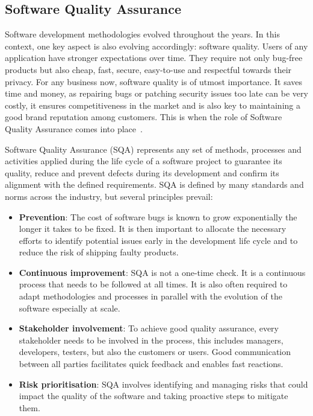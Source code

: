 \subsection{Software Quality Assurance}

Software development methodologies evolved throughout the years. In this context, one key aspect is also evolving accordingly: software quality. Users of any application have stronger expectations over time. They require not only bug-free products but also cheap, fast, secure, easy-to-use and respectful towards their privacy. For any business now, software quality is of utmost importance. It saves time and money, as repairing bugs or patching security issues too late can be very costly, it ensures competitiveness in the market and is also key to maintaining a good brand reputation among customers. This is when the role of Software Quality Assurance comes into place~\cite{galin2004software,beizer1984software,tripathy2011software}.

Software Quality Assurance (SQA) represents any set of methods, processes and activities applied during the life cycle of a software project to guarantee its quality, reduce and prevent defects during its development and confirm its alignment with the defined requirements. SQA is defined by many standards and norms across the industry, but several principles prevail:
\begin{itemize}[label={}]
    \item \textbf{Prevention}: The cost of software bugs is known to grow exponentially the longer it takes to be fixed. It is then important to allocate the necessary efforts to identify potential issues early in the development life cycle and to reduce the risk of shipping faulty products.  
    \item \textbf{Continuous improvement}: SQA is not a one-time check. It is a continuous process that needs to be followed at all times. It is also often required to adapt methodologies and processes in parallel with the evolution of the software especially at scale.
    \item \textbf{Stakeholder involvement}: To achieve good quality assurance, every stakeholder needs to be involved in the process, this includes managers, developers, testers, but also the customers or users. Good communication between all parties facilitates quick feedback and enables fast reactions.
    \item \textbf{Risk prioritisation}: SQA involves identifying and managing risks that could impact the quality of the software and taking proactive steps to mitigate them.
\end{itemize}

